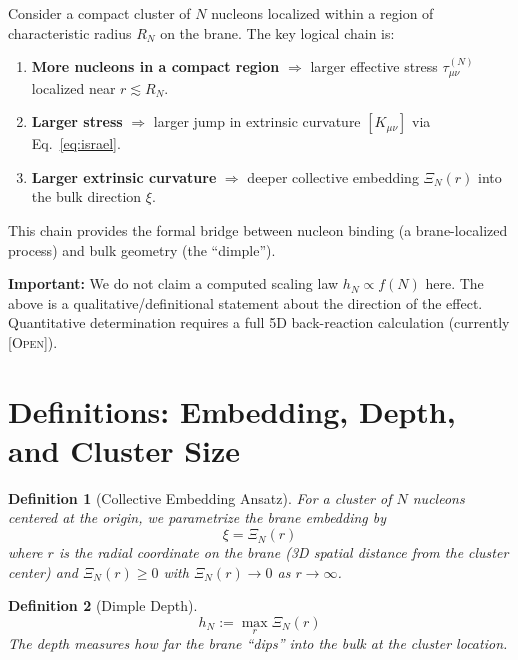 \documentclass[11pt,a4paper]{article}
\newtheorem{definition}{Definition}
\newcommand{\Open}{\textsc{[Open]}}
\begin{document}
Consider a compact cluster of $N$ nucleons localized within a region of
characteristic radius $R_N$ on the brane. The key logical chain is:

\begin{enumerate}
\item \textbf{More nucleons in a compact region} $\Rightarrow$
larger effective stress $\tau_{\mu\nu}^{(N)}$ localized near $r \lesssim R_N$.

\item \textbf{Larger stress} $\Rightarrow$
larger jump in extrinsic curvature $[K_{\mu\nu}]$ via Eq.~\eqref{eq:israel}.

\item \textbf{Larger extrinsic curvature} $\Rightarrow$
deeper collective embedding $\Xi_N(r)$ into the bulk direction $\xi$.
\end{enumerate}

This chain provides the formal bridge between nucleon binding
(a brane-localized process) and bulk geometry (the ``dimple'').

\textbf{Important:} We do not claim a computed scaling law $h_N \propto f(N)$
here. The above is a qualitative/definitional statement about the direction
of the effect. Quantitative determination requires a full 5D back-reaction
calculation (currently \Open).

\section{Definitions: Embedding, Depth, and Cluster Size}
\label{sec:definitions}

\begin{definition}[Collective Embedding Ansatz]
\label{def:embedding}
For a cluster of $N$ nucleons centered at the origin, we parametrize the
brane embedding by
\begin{equation}
\xi = \Xi_N(r)
\end{equation}
where $r$ is the radial coordinate on the brane (3D spatial distance from
the cluster center) and $\Xi_N(r) \geq 0$ with $\Xi_N(r) \to 0$ as $r \to \infty$.
\end{definition}

\begin{definition}[Dimple Depth]
\begin{equation}
h_N := \max_r \Xi_N(r)
\end{equation}
The depth measures how far the brane ``dips'' into the bulk at the cluster
location.
\end{definition}
\end{document}
